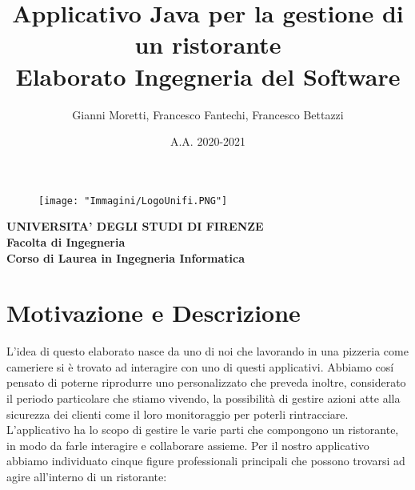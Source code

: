 \documentclass{article}
\title{\LARGE Applicativo Java per la gestione di un ristorante \\
\large Elaborato Ingegneria del Software}
\author{Gianni Moretti, Francesco Fantechi, Francesco Bettazzi}
\date{A.A. 2020-2021}
\begin{document}
\maketitle

\begin{figure}[!h]
\centering
\texttt{[image: "Immagini/LogoUnifi.PNG"]}
\end{figure}

\begin{center}
\textbf{\large UNIVERSITA' DEGLI STUDI DI FIRENZE \\
Facolta di Ingegneria \\
\normalsize Corso di Laurea in Ingegneria Informatica}
\end{center}


\newpage

\tableofcontents

\newpage

\section{Motivazione e Descrizione}
L'idea di questo elaborato nasce da uno di noi che lavorando in una pizzeria come cameriere si è trovato ad interagire con uno di questi applicativi. Abbiamo cos\'i pensato di poterne riprodurre uno personalizzato che preveda inoltre, considerato il periodo particolare che stiamo vivendo, la possibilità di gestire azioni atte alla sicurezza dei clienti come il loro monitoraggio per poterli rintracciare. \\
L'applicativo ha lo scopo di gestire le varie parti che compongono un ristorante, in modo da farle interagire e collaborare assieme. Per il nostro applicativo abbiamo individuato cinque figure professionali principali che possono trovarsi ad agire all'interno di un ristorante:
\end{document}
